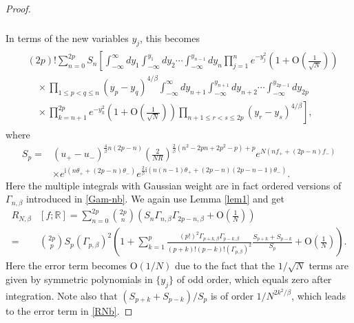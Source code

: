 \documentclass[11pt,a4paper]{article}
\numberwithin{equation}{section} %
\theoremstyle{plain}
\theoremstyle{definition}
\numberwithin{prop}{section}
\numberwithin{cor}{section}
\numberwithin{remark}{section}
\begin{document}
\begin{proof}
\begin{align*}
\begin{aligned}
\end{aligned}
\end{align*}
In terms of the new variables $y_j$, this becomes
\begin{align*}
    \begin{aligned}
& (2p)!\sum_{n=0}^{2p} S_n\left[\int_{-\infty}^{\infty} d y_1 \int_{-\infty}^{y_1} d y_2 \cdots \int_{-\infty}^{y_{n-1}} d y_n \prod_{j=1}^n e^{-y_j^2}\left(1+\mathrm{O}\left(\frac{1}{\sqrt{N}}\right)\right)\right. \\
& \quad \times \prod_{1 \leqslant p<q \leqslant n}\left(y_p-y_q\right)^{4 / \beta} \int_{-\infty}^{\infty} d y_{n+1} \int_{-\infty}^{y_{n+1}} d y_{n+2} \cdots \int_{-\infty}^{y_{2p-1}} d y_{2p} \\
& \left.\quad \times \prod_{k=n+1}^{2p} e^{-y_k^2}\left(1+\mathrm{O}\left(\frac{1}{\sqrt{N}}\right)\right) \prod_{n+1 \leqslant r<s \leqslant 2p}\left(y_r-y_s\right)^{4 / \beta}\right],
\end{aligned}
\end{align*}
where
\begin{align*}
    S_p=&(u_+-u_-)^{\frac{4}{\beta}n(2p-n)}\left(\frac{2}{NR}\right)^{\frac{2}{\beta}(n^2-2pn+2p^2-p)+p}e^{N(nf_++(2p-n)f_-)}\nonumber\\
    &\times e^{\mathrm{i}(n\theta_++(2p-n)\theta_-)}e^{\frac{2}{\beta}\mathrm{i}(n(n-1)\theta_++(2p-n)(2p-n-1)\theta_-)}.
\end{align*}
Here the multiple integrals with Gaussian weight are in fact ordered versions of $\Gamma_{n,\beta}$ introduced in \eqref{Gam-nb}. We again use Lemma \ref{lem1} and get
\begin{align*}
    R_{N,\beta}&[f;\mathbb{R}]=\sum_{n=0}^{2p}\binom{2p}{n}\left(S_n\Gamma_{n,\beta}\Gamma_{2p-n,\beta}+\mathrm{O}\left(\frac{1}{N}\right)\right)\nonumber\\
    =&\binom{2p}{p}S_p(\Gamma_{p,\beta})^2\left(1+\sum_{k=1}^{p}\frac{(p!)^2\Gamma_{p+k,\beta}\Gamma_{p-k,\beta}}{(p+k)!(p-k)!(\Gamma_{p,\beta})^2}\frac{S_{p+k}+S_{p-k}}{S_p}+\mathrm{O}\left(\frac{1}{N}\right) \right).
\end{align*}
Here the error term becomes $\mathrm{O}(1/N)$ due to the fact that the $1/\sqrt{N}$ terms are given by symmetric polynomials in $\{y_j\}$ of odd order, which equals zero after integration.
Note also that $(S_{p+k}+S_{p-k})/{S_p}$ is of order $1/N^{2k^2/\beta}$, which leads to the error term in \eqref{RNb}.
\end{proof}
\end{document}
